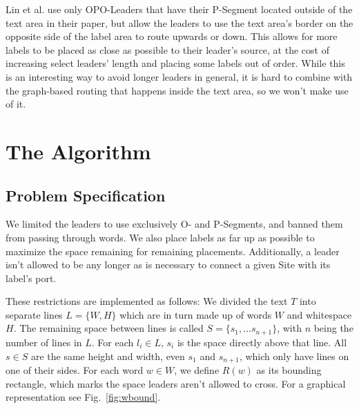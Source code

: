 \documentclass[11pt,a4paper]{vutinfth}
\begin{document}
Lin et al.\cite{Lin2009} use only OPO-Leaders that have their P-Segment located outside of the text area in their paper, but allow the leaders to use the text area's border on the opposite side of the label area to route upwards or down. This allows for more labels to be placed as close as possible to their leader's source, at the cost of increasing select leaders' length and placing some labels out of order. While this is an interesting way to avoid longer leaders in general, it is hard to combine with the graph-based routing that happens inside the text area, so we won't make use of it.


\chapter{The Algorithm}
\section{Problem Specification}
We limited the leaders to use exclusively O- and P-Segments, and banned them from passing through words. We also place labels as far up as possible to maximize the space remaining for  remaining placements. Additionally, a leader isn't allowed to be any longer as is necessary to connect a given Site with its label's port.

These restrictions are implemented as follows: We divided the text $T$ into separate lines $L=\{W,H\}$ which are in turn made up of words $W$ and whitespace $H$. The remaining space between lines is called $S=\{s_1, ... s_{n+1}\}$, with $n$ being the number of lines in $L$. For each $l_i \in L$,  $s_i$ is the space directly above that line. All $s \in S$ are the same height and width, even $s_1$ and $s_{n+1}$, which only have lines on one of their sides. For each word $w \in W$, we define $R(w)$  as its bounding rectangle, which marks the space leaders aren't allowed to cross. For a graphical representation see Fig.~\ref{fig:wbound}.
\end{document}
